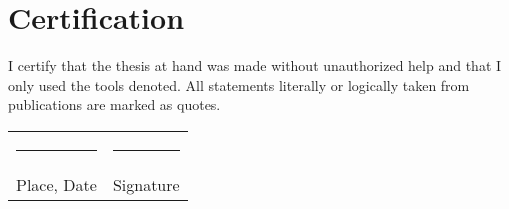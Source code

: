 %
%
% 
%






\chapter*{Certification}
    
    
        I certify that the thesis at hand was made without unauthorized help and that I only used the tools denoted. All statements literally or logically taken from publications are marked as quotes. \par
        \vspace{4\normalbaselineskip}
        
        \begin{tabular}{p{} l}
            \rule{\textwidth/3}{0.4pt}   &   \rule{\textwidth/3}{0.4pt} \\
            Place, Date                  &   Signature
        \end{tabular}
\thispagestyle{empty}